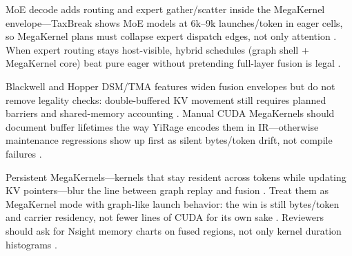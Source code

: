 MoE decode adds routing and expert gather/scatter inside the MegaKernel envelope---TaxBreak shows MoE models at 6k--9k launches/token in eager cells, so MegaKernel plans must collapse expert dispatch edges, not only attention \citep{taxbreak2026,liu2024deepseekv3,kwon2023vllm}. When expert routing stays host-visible, hybrid schedules (graph shell + MegaKernel core) beat pure eager without pretending full-layer fusion is legal \citep{nvidia2024cudagraphs,yirage2026,patel2025llminference}.

Blackwell and Hopper DSM/TMA features widen fusion envelopes but do not remove legality checks: double-buffered KV movement still requires planned barriers and shared-memory accounting \citep{nvidia2022hopper,semianalysis2024tma,memoryfloor2026}. Manual CUDA MegaKernels should document buffer lifetimes the way YiRage encodes them in IR---otherwise maintenance regressions show up first as silent bytes/token drift, not compile failures \citep{yirage2026,chen2020compilerbasedhardw,patel2025llminference,dao2022flashattention,amd2024aie,dlbook}.

Persistent MegaKernels---kernels that stay resident across tokens while updating KV pointers---blur the line between graph replay and fusion \citep{nvidia2024cudagraphs,taxbreak2026,yirage2026,memoryfloor2026}. Treat them as MegaKernel mode with graph-like launch behavior: the win is still bytes/token and carrier residency, not fewer lines of CUDA for its own sake \citep{dao2022flashattention,patel2025llminference,semianalysis2024tma,amd2024xdna,chen2020compilerbasedhardw,kwon2023vllm,liu2024deepseekv3,dlbook,amd2024aie,nvidia2022hopper,dao2023flashdecoding,taxbreak2026,memoryfloor2026,nvidia2024cudagraphs,yirage2026}. Reviewers should ask for Nsight memory charts on fused regions, not only kernel duration histograms \citep{patel2025llminference,memoryfloor2026,taxbreak2026,yirage2026,chen2020compilerbasedhardw,semianalysis2024tma,amd2024xdna,amd2024aie,nvidia2022hopper,dao2022flashattention,kwon2023vllm,liu2024deepseekv3,dlbook,dao2023flashdecoding,nvidia2024cudagraphs}.

